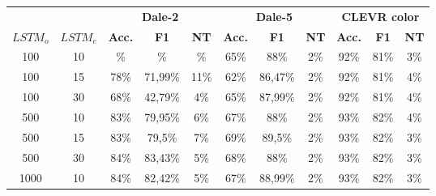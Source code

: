 \begin{table}[ht]
    \centering
    \begin{tabular}{cc|ccc|ccc|ccc}
        \toprule
                 &          & \multicolumn{3}{c}{\textbf{Dale-2}} & \multicolumn{3}{c}{\textbf{Dale-5}} & \multicolumn{3}{c}{\textbf{CLEVR color}}                                                                                         \\\cmidrule(lr){3-5}\cmidrule(lr){6-8}\cmidrule(lr){9-11}
        $LSTM_o$ & $LSTM_e$ & \textbf{Acc.}                       & \textbf{F1}                         & \textbf{NT}                              & \textbf{Acc.} & \textbf{F1} & \textbf{NT} & \textbf{Acc.} & \textbf{F1} & \textbf{NT} \\\midrule
        {100}    & {10}     & {\%}                                & {\%}                                & {\%}                                     & {65\%}        & {88\%}      & {2\%}       & {92\%}        & {81\%}      & {3\%}       \\
        {100}    & {15}     & {78\%}                              & {71,99\%}                           & {11\%}                                   & {62\%}        & {86,47\%}   & {2\%}       & {92\%}        & {81\%}      & {4\%}       \\
        {100}    & {30}     & {68\%}                              & {42,79\%}                           & {4\%}                                    & {65\%}        & {87,99\%}   & {2\%}       & {92\%}        & {81\%}      & {4\%}       \\
        {500}    & {10}     & {83\%}                              & {79,95\%}                           & {6\%}                                    & {67\%}        & {88\%}      & {2\%}       & {93\%}        & {82\%}      & {4\%}       \\
        {500}    & {15}     & {83\%}                              & {79,5\%}                            & {7\%}                                    & {69\%}        & {89,5\%}    & {2\%}       & {93\%}        & {82\%}      & {3\%}       \\
        {500}    & {30}     & {84\%}                              & {83,43\%}                           & {5\%}                                    & {68\%}        & {88\%}      & {2\%}       & {93\%}        & {82\%}      & {3\%}       \\
        {1000}   & {10}     & {84\%}                              & {82,42\%}                           & {5\%}                                    & {67\%}        & {88,99\%}   & {2\%}       & {93\%}        & {82\%}      & {3\%}       \\

\end{tabular}
\end{table}

